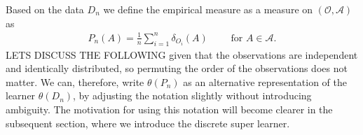 \documentclass[11pt, a4paper]{article}
\renewcommand\tag[1]{\color{blue} #1 \color{black}}
\theoremstyle{definition}
\theoremstyle{remark}
\newtheorem{example}{Example}
\newcommand{\btheta}{\theta}
\begin{document}
Based on the data $ D_n $ we define the
empirical measure as a measure on
$ (\mathcal{O} , \mathcal{A}) $ as
\begin{align*}
    P_n(A) = \frac{1}{n} \sum_{i = 1}^{n} \delta_{O_i}(A)\qquad \text{ for } A \in \mathcal{A}.
\end{align*}
\tag{LETS DISCUSS THE FOLLOWING}
given that the observations are independent and identically
distributed, so permuting the order of the observations does not
matter. We can, therefore, write $ \btheta(P_n)$ as an alternative
representation of the learner $\btheta(D_n)$, by adjusting the
notation slightly without introducing ambiguity. The motivation for
using this notation will become clearer in the subsequent section,
where we introduce the discrete super learner.


%
\end{document}
